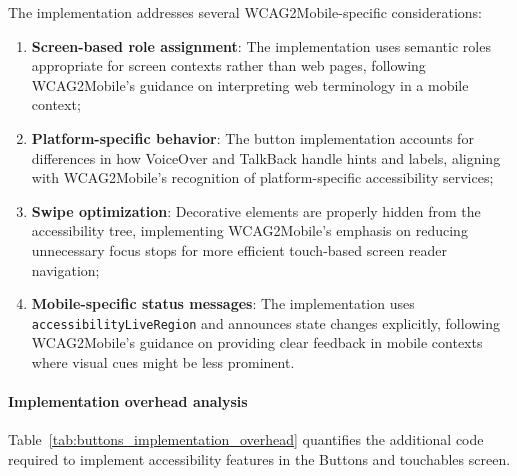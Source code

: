 The implementation addresses several WCAG2Mobile-specific considerations:

\begin{enumerate}
    \item \textbf{Screen-based role assignment}: The implementation uses semantic roles appropriate for screen contexts rather than web pages, following WCAG2Mobile's guidance on interpreting web terminology in a mobile context;
    
    \item \textbf{Platform-specific behavior}: The button implementation accounts for differences in how VoiceOver and TalkBack handle hints and labels, aligning with WCAG2Mobile's recognition of platform-specific accessibility services;
    
    \item \textbf{Swipe optimization}: Decorative elements are properly hidden from the accessibility tree, implementing WCAG2Mobile's emphasis on reducing unnecessary focus stops for more efficient touch-based screen reader navigation;
    
    \item \textbf{Mobile-specific status messages}: The implementation uses \texttt{accessibilityLiveRegion} and announces state changes explicitly, following WCAG2Mobile's guidance on providing clear feedback in mobile contexts where visual cues might be less prominent.
\end{enumerate}

\paragraph{Implementation overhead analysis}

Table~\ref{tab:buttons_implementation_overhead} quantifies the additional code required to implement accessibility features in the Buttons and touchables screen.

